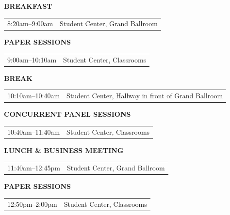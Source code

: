 \documentclass[
  10pt,
  letterpaper,
  DIV=11,
  numbers=noendperiod]{scrartcl}
\begin{document}
{\renewcommand{\arraystretch}{0.9}

\noindent\textcolor{event}{\textbf{BREAKFAST}}

\begin{tabular}{@{}p{3.2cm}p{\dimexpr\linewidth-3.5cm}@{}}
  8:20am--9:00am & Student Center, Grand Ballroom \\
\end{tabular}

\vspace{0.25em}

\noindent\textcolor{event}{\textbf{PAPER SESSIONS}}

\begin{tabular}{@{}p{3.2cm}p{\dimexpr\linewidth-3.5cm}@{}}
  9:00am--10:10am & Student Center, Classrooms \\
\end{tabular}

\vspace{0.25em}

\noindent\textcolor{event}{\textbf{BREAK}}

\begin{tabular}{@{}p{3.2cm}p{\dimexpr\linewidth-3.5cm}@{}}
  10:10am--10:40am & Student Center, Hallway in front of Grand Ballroom \\
\end{tabular}

\vspace{0.25em}

\noindent\textcolor{event}{\textbf{CONCURRENT PANEL SESSIONS}}

\begin{tabular}{@{}p{3.2cm}p{\dimexpr\linewidth-3.5cm}@{}}
  10:40am--11:40am & Student Center, Classrooms \\
\end{tabular}

\vspace{0.25em}

\noindent\textcolor{event}{\textbf{LUNCH \& BUSINESS MEETING}}

\begin{tabular}{@{}p{3.2cm}p{\dimexpr\linewidth-3.5cm}@{}}
  11:40am--12:45pm & Student Center, Grand Ballroom \\
\end{tabular}

\vspace{0.25em}

\noindent\textcolor{event}{\textbf{PAPER SESSIONS}}

\begin{tabular}{@{}p{3.2cm}p{\dimexpr\linewidth-3.5cm}@{}}
  12:50pm--2:00pm & Student Center, Classrooms \\
\end{tabular}

}
\end{document}
